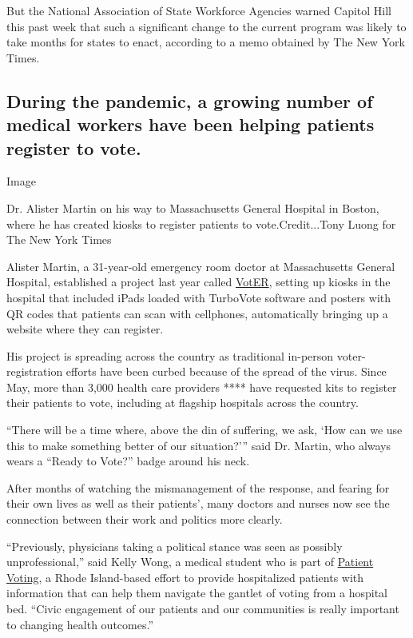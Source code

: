 But the National Association of State Workforce Agencies warned Capitol
Hill this past week that such a significant change to the current
program was likely to take months for states to enact, according to a
memo obtained by The New York Times.

\hypertarget{during-the-pandemic-a-growing-number-of-medical-workers-have-been-helping-patients-register-to-vote}{%
\subsection{During the pandemic, a growing number of medical workers
have been helping patients register to
vote.}\label{during-the-pandemic-a-growing-number-of-medical-workers-have-been-helping-patients-register-to-vote}}

Image

Dr. Alister Martin on his way to Massachusetts General Hospital in
Boston, where he has created kiosks to register patients to
vote.Credit...Tony Luong for The New York Times

Alister Martin, a 31-year-old emergency room doctor at Massachusetts
General Hospital, established a project last year called
\href{https://vot-er.org/}{VotER}, setting up kiosks in the hospital
that included iPads loaded with TurboVote software and posters with QR
codes that patients can scan with cellphones, automatically bringing up
a website where they can register.

His project is spreading across the country as traditional in-person
voter-registration efforts have been curbed because of the spread of the
virus. Since May, more than 3,000 health care providers **** have
requested kits to register their patients to vote, including at flagship
hospitals across the country.

``There will be a time where, above the din of suffering, we ask, `How
can we use this to make something better of our situation?''' said Dr.
Martin, who always wears a ``Ready to Vote?'' badge around his neck.

After months of watching the mismanagement of the response, and fearing
for their own lives as well as their patients', many doctors and nurses
now see the connection between their work and politics more clearly.

``Previously, physicians taking a political stance was seen as possibly
unprofessional,'' said Kelly Wong, a medical student who is part of
\href{https://www.patientvoting.com/}{Patient Voting}, a Rhode
Island-based effort to provide hospitalized patients with information
that can help them navigate the gantlet of voting from a hospital bed.
``Civic engagement of our patients and our communities is really
important to changing health outcomes.''

